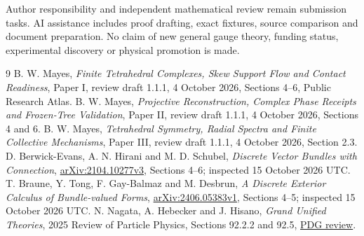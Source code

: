 \documentclass[11pt,a4paper]{article}
\begin{document}
Author responsibility and independent mathematical review remain
submission tasks. AI assistance includes proof drafting, exact
fixtures, source comparison and document preparation. No claim
of new general gauge theory, funding status, experimental discovery
or physical promotion is made.

\begin{thebibliography}{9}
 B. W. Mayes, \emph{Finite Tetrahedral Complexes, Skew Support
Flow and Contact Readiness}, Paper I, review draft 1.1.1, 4 October 2026,
Sections 4--6, Public Research Atlas.
 B. W. Mayes, \emph{Projective Reconstruction, Complex Phase
Receipts and Frozen-Tree Validation}, Paper II, review draft 1.1.1,
4 October 2026, Sections 4 and 6.
 B. W. Mayes, \emph{Tetrahedral Symmetry, Radial Spectra and
Finite Collective Mechanisms}, Paper III, review draft 1.1.1,
4 October 2026, Section 2.3.
 D. Berwick-Evans, A. N. Hirani and M. D. Schubel,
\emph{Discrete Vector Bundles with Connection},
\href{https://arxiv.org/html/2104.10277v3}{arXiv:2104.10277v3},
Sections 4--6; inspected 15 October 2026 UTC.
 T. Braune, Y. Tong, F. Gay-Balmaz and M. Desbrun,
\emph{A Discrete Exterior Calculus of Bundle-valued Forms},
\href{https://arxiv.org/html/2406.05383v1}{arXiv:2406.05383v1},
Sections 4--5; inspected 15 October 2026 UTC.
 N. Nagata, A. Hebecker and J. Hisano,
\emph{Grand Unified Theories}, 2025 Review of Particle Physics,
Sections 92.2.2 and 92.5,
\href{https://pdg.lbl.gov/2025/reviews/rpp2025-rev-guts.pdf}{PDG review}.
\end{thebibliography}
\end{document}
